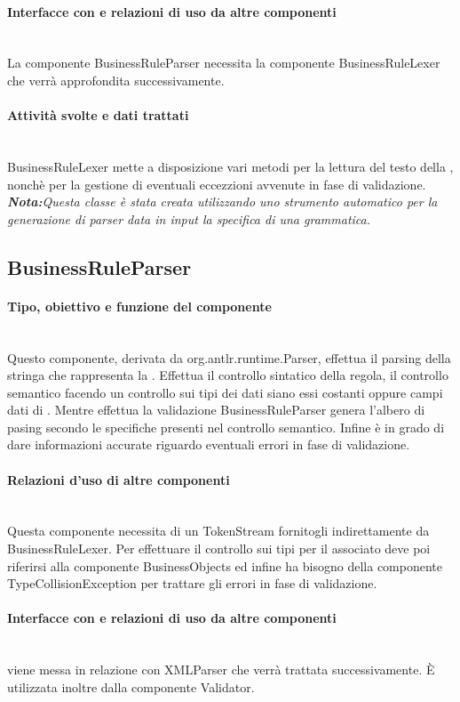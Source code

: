 \documentclass[11pt,titlepage,a4paper]{report}
\begin{document}
\paragraph{Interfacce con e relazioni di uso da altre componenti}\\
La componente BusinessRuleParser necessita la componente BusinessRuleLexer che verr\`a approfondita successivamente.
\paragraph{Attivit\`a svolte e dati trattati}\\
BusinessRuleLexer mette a disposizione vari metodi per la lettura del testo della \br, nonch\`e per la gestione di eventuali eccezzioni avvenute in fase di validazione.
\textit{\textbf{Nota:}Questa classe \`e stata creata utilizzando uno strumento automatico per la generazione di parser data in input la specifica di una grammatica.}

\subsection{BusinessRuleParser}
\paragraph{Tipo, obiettivo e funzione del componente}\\
Questo componente, derivata da org.antlr.runtime.Parser, effettua il parsing della stringa che rappresenta la \br. Effettua il controllo sintatico della regola, il controllo semantico facendo un controllo sui tipi dei dati siano essi costanti oppure campi dati di \bos. Mentre effettua la validazione BusinessRuleParser genera l'albero di pasing secondo le specifiche presenti nel controllo semantico. Infine \`e in grado di dare informazioni accurate 
riguardo eventuali errori in fase di validazione.
\paragraph{Relazioni d'uso di altre componenti}\\
Questa componente necessita di un TokenStream fornitogli indirettamente da BusinessRuleLexer. Per effettuare il controllo sui tipi per il \bo associato deve poi riferirsi alla componente BusinessObjects ed infine ha bisogno della componente TypeCollisionException per trattare gli errori in fase di validazione.
\paragraph{Interfacce con e relazioni di uso da altre componenti}\\
\brp viene messa in relazione con XMLParser che verr\`a trattata successivamente.
\`E utilizzata inoltre dalla componente Validator.
\end{document}
